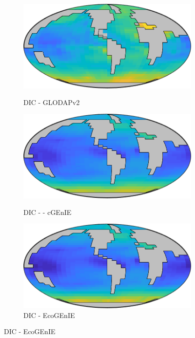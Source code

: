 \documentclass{article}
\begin{document}
\begin{figure}[htp]
 \centering
\begin{subfigure}{.33\textwidth}
 \caption{DIC - GLODAPv2}
 \includegraphics[width=0.95\linewidth]{../separate_figures/OBSERVATIONS/surface_TCO2.png}
 \label{fig:nutrients1}
\end{subfigure}%
\begin{subfigure}{.33\textwidth}	
 \caption{DIC -  - cGEnIE}
 \includegraphics[width=0.95\linewidth]{../separate_figures/BIOGEM/ocn_DIC.png}
 \label{fig:carbon1}
\end{subfigure}%
\begin{subfigure}{.33\textwidth}
 \caption{DIC - EcoGEnIE}
 \includegraphics[width=0.95\linewidth]{../separate_figures/ECOGEM/ocn_DIC.png}

\end{subfigure}
\end{figure}
\end{document}
